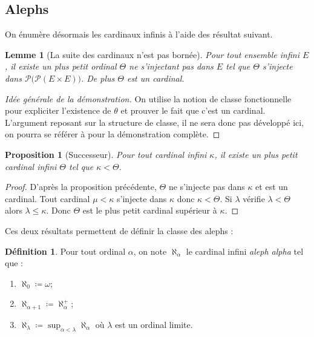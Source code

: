 \documentclass[french]{article}
\theoremstyle{definition}
\newtheorem{definition}[subsubsection]{Définition}
\theoremstyle{plain}
\newtheorem{proposition}[subsubsection]{Proposition}
\theoremstyle{plain}
\theoremstyle{plain}
\newtheorem{lemma}[subsubsection]{Lemme}
\theoremstyle{plain}
\theoremstyle{plain}
\begin{document}
\subsection{Alephs}

\par On énumère désormais les cardinaux infinis à l'aide des résultat suivant.

\begin{lemma}[La suite des cardinaux n'est pas bornée]
	Pour tout ensemble infini \( E \), il existe un plus petit ordinal \( \Theta \) ne s'injectant pas dans \( E \) tel que \( \Theta \) s'injecte dans \( \mathcal{P(\mathcal{P}}(E \times E))\). De plus \( \Theta \) est un cardinal.
\end{lemma}
\begin{proof}[Idée générale de la démonstration]
	On utilise la notion de classe fonctionnelle pour expliciter l'existence de \( \theta \) et prouver le fait que c'est un cardinal. L'argument reposant sur la structure de classe, il ne sera donc pas développé ici, on pourra se référer à \cite{dehornoy2017théorie} pour la démonstration complète.
\end{proof}

\begin{proposition}[Successeur]
	Pour tout cardinal infini \( \kappa \), il existe un plus petit cardinal infini \( \Theta \) tel que \( \kappa < \Theta \).
\end{proposition}
\begin{proof}
	D'après la proposition précédente, \( \Theta \) ne s'injecte pas dans \( \kappa \) et est un cardinal. Tout cardinal \( \mu < \kappa \) s'injecte dans \( \kappa \) donc \( \kappa < \Theta \). Si \( \lambda \) vérifie \( \lambda <  \Theta \) alors \( \lambda \le \kappa \). Donc \( \Theta \) est le plus petit cardinal supérieur à \( \kappa \).  
\end{proof}

\par Ces deux résultats permettent de définir la classe des alephs :
\begin{definition}
Pour tout ordinal \( \alpha \), on note \( \aleph_{\alpha} \) le cardinal infini \textit{aleph alpha} tel que :
	\begin{enumerate}[label = (\roman*) ]
		\item \( \aleph_{0} \coloneqq \omega \);
		\item \( \aleph_{\alpha + 1} \coloneqq \aleph_{\alpha}^{+} \);
		\item \( \aleph_{\lambda} \coloneqq \sup_{\alpha < \lambda} \aleph_{\alpha} \) où \( \lambda \) est un ordinal limite.
	\end{enumerate}
\end{definition}
\end{document}
